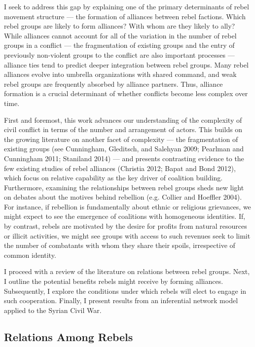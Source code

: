 \documentclass[12pt,]{article}
\begin{document}
I seek to address this gap by explaining one of the primary determinants
of rebel movement structure --- the formation of alliances between rebel
factions. Which rebel groups are likely to form alliances? With whom are
they likely to ally? While alliances cannot account for all of the
variation in the number of rebel groups in a conflict --- the
fragmentation of existing groups and the entry of previously non-violent
groups to the conflict are also important processes --- alliance ties
tend to predict deeper integration between rebel groups. Many rebel
alliances evolve into umbrella organizations with shared command, and
weak rebel groups are frequently absorbed by alliance partners. Thus,
alliance formation is a crucial determinant of whether conflicts become
less complex over time.

First and foremost, this work advances our understanding of the
complexity of civil conflict in terms of the number and arrangement of
actors. This builds on the growing literature on another facet of
complexity --- the fragmentation of existing groups (see Cunningham,
Gleditsch, and Salehyan 2009; Pearlman and Cunningham 2011; Staniland
2014) --- and presents contrasting evidence to the few existing studies
of rebel alliances (Christia 2012; Bapat and Bond 2012), which focus on
relative capability as the key driver of coalition building.
Furthermore, examining the relationships between rebel groups sheds new
light on debates about the motives behind rebellion (e.g. Collier and
Hoeffler 2004). For instance, if rebellion is fundamentally about ethnic
or religious grievances, we might expect to see the emergence of
coalitions with homogeneous identities. If, by contrast, rebels are
motivated by the desire for profits from natural resources or illicit
activities, we might see groups with access to such revenues seek to
limit the number of combatants with whom they share their spoils,
irrespective of common identity.

I proceed with a review of the literature on relations between rebel
groups. Next, I outline the potential benefits rebels might receive by
forming alliances. Subsequently, I explore the conditions under which
rebels will elect to engage in such cooperation. Finally, I present
results from an inferential network model applied to the Syrian Civil
War.

\subsection{Relations Among Rebels}\label{relations-among-rebels}
\end{document}
